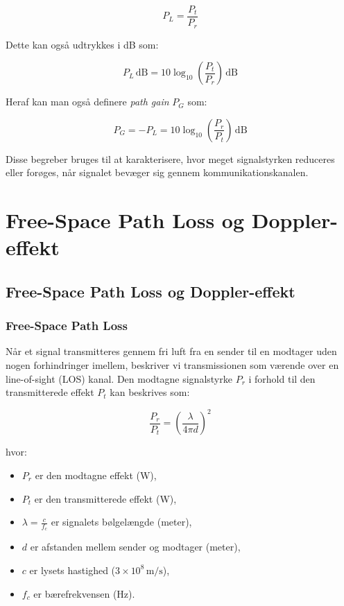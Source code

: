 \documentclass[a4paper,12pt]{book}
\begin{document}
	\[
	P_L = \frac{P_t}{P_r}
	\]
	
	\noindent Dette kan også udtrykkes i dB som:
	
	\[
	P_L \, \text{dB} = 10 \log_{10} \left( \frac{P_t}{P_r} \right) \, \text{dB}
	\]
	
	\noindent Heraf kan man også definere \textit{path gain} \( P_G \) som:
	
	\[
	P_G = -P_L = 10 \log_{10} \left( \frac{P_r}{P_t} \right) \, \text{dB}
	\]
	
	\noindent Disse begreber bruges til at karakterisere, hvor meget signalstyrken reduceres eller forøges, når signalet bevæger sig gennem kommunikationskanalen.
	
	\chapter{Free-Space Path Loss og Doppler-effekt}
	
	\section{Free-Space Path Loss og Doppler-effekt}
	
	\subsection{Free-Space Path Loss}
	Når et signal transmitteres gennem fri luft fra en sender til en modtager uden nogen forhindringer imellem, beskriver vi transmissionen som værende over en line-of-sight (LOS) kanal. Den modtagne signalstyrke \( P_r \) i forhold til den transmitterede effekt \( P_t \) kan beskrives som:
	
	\[
	\frac{P_r}{P_t} = \left( \frac{\lambda}{4\pi d} \right)^2
	\]
	
	hvor:
	\begin{itemize}
		\item \( P_r \) er den modtagne effekt (W),
		\item \( P_t \) er den transmitterede effekt (W),
		\item \( \lambda = \frac{c}{f_c} \) er signalets bølgelængde (meter),
		\item \( d \) er afstanden mellem sender og modtager (meter),
		\item \( c \) er lysets hastighed (\(3 \times 10^8 \, \text{m/s}\)),
		\item \( f_c \) er bærefrekvensen (Hz).
	\end{itemize}
	
\end{document}
